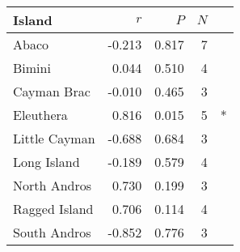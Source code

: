 
\begin{tabular}{lrrrl}
\toprule
Island & $r$ & $P$ & $N$ & \\
\midrule
Abaco & -0.213 & 0.817 & 7 & \\
Bimini & 0.044 & 0.510 & 4 & \\
Cayman Brac & -0.010 & 0.465 & 3 & \\
Eleuthera & 0.816 & 0.015 & 5 & *\\
Little Cayman & -0.688 & 0.684 & 3 & \\
Long Island & -0.189 & 0.579 & 4 & \\
North Andros & 0.730 & 0.199 & 3 & \\
Ragged Island & 0.706 & 0.114 & 4 & \\
South Andros & -0.852 & 0.776 & 3 & \\
\bottomrule
\end{tabular}
